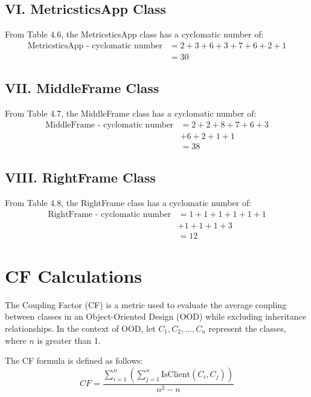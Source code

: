 \documentclass[english,12pt,a4paper]{report}
\begin{document}
	\subsection*{VI. MetricsticsApp Class}
	
	From Table 4.6, the MetricsticsApp class has a cyclomatic number of:
	\begin{align*}
		\text{MetricsticsApp - cyclomatic number} &= 2 + 3 + 6 + 3 + 7 + 6 + 2 + 1  \\
		&= 30
	\end{align*} 
	
	\subsection*{VII. MiddleFrame Class}
	
	From Table 4.7, the MiddleFrame class has a cyclomatic number of:
	\begin{align*}
		\text{MiddleFrame - cyclomatic number} &= 2 + 2 + 8 + 7 + 6 + 3\\
		& + 6 + 2 + 1 + 1 \\
		&= 38
	\end{align*} 
	
	\subsection*{VIII. RightFrame Class}
	
	From Table 4.8, the RightFrame class has a cyclomatic number of:
	\begin{align*}
		\text{RightFrame - cyclomatic number} &= 1 + 1 + 1 + 1 + 1 + 1\\
		& + 1 + 1 + 1 + 3 \\
		&= 12
	\end{align*} 
	
	\section{CF Calculations}
	The Coupling Factor (CF) is a metric used to evaluate the average coupling between classes in an Object-Oriented Design (OOD) while excluding inheritance relationships. In the context of OOD, let \(C_1, C_2, \ldots, C_n\) represent the classes, where \(n\) is greater than 1.
	
	The CF formula is defined as follows:
	\begin{equation}
		CF = \frac{\sum_{i=1}^{n} \left( \sum_{j=1}^{n} \text{IsClient}(C_i, C_j) \right)}{n^2 - n}
		\tag{Equation 18}
	\end{equation}
	
\end{document}
